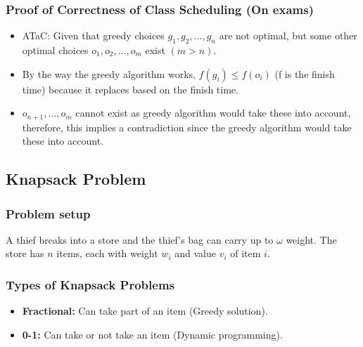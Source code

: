 \subsubsection{Proof of Correctness of Class Scheduling (On exams)}
\begin{derivation}
    \begin{itemize}
        \item ATaC: Given that greedy choices $g_1, g_2, \dots, g_n$ are not optimal, but some other optimal choices $o_1, o_2, \dots, o_m$ exist $(m > n)$. 
        \item By the way the greedy algorithm works, $f(g_i) \leq f(o_i)$ (f is the finish time) because it replaces based on the finish time. 
        \item $o_{n+1},\dots, o_m$ cannot exist as greedy algorithm would take these into account, therefore, this implies a contradiction since the greedy algorithm would take these into account.
    \end{itemize}
\end{derivation}

\subsection{Knapsack Problem}

\subsubsection{Problem setup}
\begin{intuition}
A thief breaks into a store and the thief's bag can carry up to $\omega$ weight. The store has $n$ items, each with weight $w_i$ and value $v_i$ of item $i$.
\end{intuition}

\subsubsection{Types of Knapsack Problems}
\begin{definition}
    \begin{itemize}
        \item \textbf{Fractional:} Can take part of an item (Greedy solution).
        \item \textbf{0-1:} Can take or not take an item (Dynamic programming).
    \end{itemize}
\end{definition}


